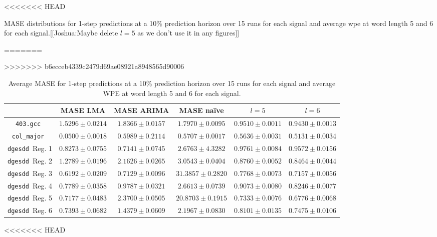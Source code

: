 \documentclass{article}
\newcommand{\gcc}{{\tt 403.gcc}~}
\newcommand{\svd}{{\tt dgesdd}~}
\newcommand{\col}{{\tt col\_major}~}
\begin{document}
\begin{table}[htdp]
<<<<<<< HEAD
\caption{MASE distributions for 1-step predictions at a 10\% prediction horizon over 15 runs for each signal and average wpe at word length 5 and 6 for each signal.[[Joshua:Maybe delete $l=5$ as we don't use it in any figures]] }
=======
\caption{Average MASE for 1-step predictions at a 10\% prediction horizon over 15 runs for each signal and average WPE at word length 5 and 6 for each signal. }
>>>>>>> b6ecceb4339c2479d69ae08921a8948565d90006
\begin{center}
\begin{tabular}{|c|c|c|c|c|c|}
\hline
                   & MASE LMA    & MASE ARIMA &MASE na\"{i}ve & $l=5$  & $l=6$ \\
\hline
\gcc                  & $ 1.5296\pm 0.0214$ & $1.8366 \pm0.0157 $ & $1.7970\pm0.0095$& $0.9510 \pm 0.0011$ & $0.9430 \pm 0.0013$ \\

\col           & $ 0.0500 \pm0.0018  $ & $0.5989  \pm 0.2114 $ & $0.5707\pm0.0017$& $0.5636 \pm 0.0031$ & $0.5131 \pm 0.0034$ \\

\svd Reg. 1     & $ 0.8273\pm 0.0755$ & $ 0.7141\pm 0.0745 $ & $2.6763\pm4.3282$& $0.9761 \pm 0.0084$ & $0.9572 \pm 0.0156$ \\
\svd Reg. 2     & $1.2789 \pm0.0196 $ & $2.1626 \pm0.0265 $ &  $3.0543\pm0.0404$ &  $0.8760 \pm 0.0052$ & $0.8464 \pm0.0044$ \\
\svd Reg. 3       & $0.6192 \pm0.0209 $ & $0.7129 \pm 0.0096 $ & $31.3857\pm 0.2820$ & $0.7768 \pm 0.0073$ & $0.7157 \pm 0.0056$ \\
\svd Reg. 4     & $ 0.7789\pm0.0358 $ & $0.9787 \pm0.0321 $ & $2.6613\pm0.0739$                          &$0.9073 \pm 0.0080$ & $0.8246 \pm 0.0077$ \\
\svd Reg. 5     & $ 0.7177\pm 0.0483 $ & $2.3700  \pm 0.0505 $ & $20.8703 \pm 0.1915$& $0.7333 \pm 0.0076$ & $0.6776 \pm 0.0068$ \\
\svd Reg. 6     & $ 0.7393\pm 0.0682 $ & $ 1.4379\pm 0.0609$ & $2.1967\pm0.0830$& $0.8101 \pm 0.0135$ & $0.7475 \pm 0.0106$ \\
\hline
\end{tabular}
\end{center}
\label{tab:error}
\end{table}%





<<<<<<< HEAD
\end{document}
